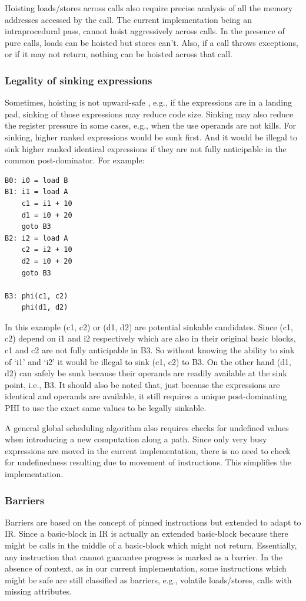 \documentclass[acmlarge,review,anonymous]{acmart}\settopmatter{printfolios=true}
\begin{document}
Hoisting loads/stores across calls also require precise analysis of all the
memory addresses accessed by the call. The current implementation being an
intraprocedural pass, cannot hoist aggressively across calls. In the presence of
pure calls, loads can be hoisted but stores can't. Also, if a call throws
exceptions, or if it may not return, nothing can be hoisted across that call.

\subsubsection{Legality of sinking expressions}
\label{subsec:legality-sink}
Sometimes, hoisting is not upward-safe \cite{click1995global}, e.g., if the
expressions are in a landing pad, sinking of those expressions
may reduce code size. Sinking may also reduce the register pressure in some
cases, e.g., when the use operands are not kills. For sinking, higher ranked
expressions would be sunk first. And it would be illegal to sink higher ranked
identical expressions if they are not fully anticipable in the common
post-dominator. For example:

\begin{verbatim}
B0: i0 = load B
B1: i1 = load A
    c1 = i1 + 10
    d1 = i0 + 20
    goto B3
B2: i2 = load A
    c2 = i2 + 10
    d2 = i0 + 20
    goto B3

B3: phi(c1, c2)
    phi(d1, d2)
\end{verbatim}

In this example (c1, c2) or (d1, d2) are potential sinkable candidates. Since
(c1, c2) depend on i1 and i2 respectively which are also in their original basic
blocks, c1 and c2 are not fully anticipable in B3. So without knowing the ability to sink
of `i1' and `i2' it would be illegal to sink (c1, c2) to B3. On the other hand
(d1, d2) can safely be sunk because their operands are readily available at the
sink point, i.e., B3. It should also be noted that, just because the expressions
are identical and operands are available, it still requires a unique
post-dominating PHI to use the exact same values to be legally sinkable.

A general global scheduling algorithm also requires checks for undefined values
when introducing a new computation along a path. Since only very busy
expressions are moved in the current implementation, there is no need to check
for undefinedness resulting due to movement of instructions. This simplifies the
implementation.

\subsubsection{Barriers}
Barriers are based on the concept of pinned instructions \cite{click1995global}
but extended to adapt to \LLVM{} IR. Since a basic-block in \LLVM{} IR is
actually an extended basic-block because there might be calls in the middle of a
basic-block which might not return. Essentially, any instruction that cannot
guarantee progress is marked as a barrier. In the absence of context, as in our
current implementation, some instructions which might be safe are still
classified as barriers, e.g., volatile loads/stores, calls with missing
attributes.
\end{document}
